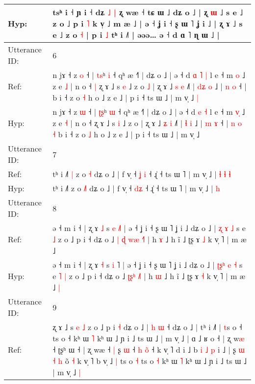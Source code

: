 \documentclass[10pt]{article}
\DeclareRobustCommand{\hl}[1]{{\textcolor{red}{#1}}}
\begin{document}
\begin{longtable}{ll}
 \\
Hyp: & tsʰ i ˧ ɲ i ˧ dʑ \hl{˩} \hl{|} ʐ wæ ˧ tɕ ɯ ˩ dʑ o ˩ | ʐ \hl{ɯ} ˩ s e ˩ z o ˩ p i \hl{˥} k v̩ ˩\hl{}\hl{} m æ ˩ | ə ˧ ʝ i ˧ ʂ ɯ ˥ ʝ i ˩ | ʐ ɤ ˩ s e ˩ z o \hl{}\hl{˧} | p i\hl{}\hl{} \hl{˩} tʰ i ˩˥ | əəə… ə ˧ d ɑ ˥ ɳ ɯ ˩ |
 \\
\midrule
Utterance ID: & 6 \\
Ref: & n jɤ ˧ z \hl{o} ˧ | \hl{t}\hl{s}ʰ \hl{i} ˧ qʰ æ ˧˥ | dʑ o ˩ | ə ˧ d\hl{ }\hl{ɑ} \hl{˥} \hl{|} l e ˧ m \hl{}\hl{o} ˩ z e \hl{˩} | n o ˧\hl{ }\hl{|} ʐ ɤ ˩ s \hl{e} ˩ z o\hl{ }\hl{˩} | ʐ ɤ ˩ \hl{s} \hl{e} ˩˥ | \hl{d}\hl{ʑ} \hl{o} ˩ | \hl{n} \hl{o} ˧ |\hl{}\hl{}\hl{}\hl{}\hl{}\hl{} b i ˧ z o \hl{˧} h o ˩ z e ˩ | p i ˧ ts ɯ ˩ | m v̩ ˩\hl{ }\hl{|}
 \\
Hyp: & n jɤ ˧ z \hl{ɯ} ˧ | \hl{ʈ}\hl{ʂ}ʰ \hl{ɯ} ˧ qʰ æ ˧˥ | dʑ o ˩ | ə ˧ d\hl{}\hl{} \hl{e} \hl{˧} l e ˧ m \hl{v}\hl{̩} ˩ z e \hl{˧} | n o ˧\hl{}\hl{} ʐ ɤ ˩ s \hl{i} ˩ z o\hl{}\hl{} | ʐ ɤ ˩ \hl{ʑ} \hl{i} ˩˥ | \hl{}\hl{ɬ} \hl{i} ˩ | \hl{m} \hl{ɤ} ˧ |\hl{ }\hl{n}\hl{ }\hl{o}\hl{ }\hl{˧} b i ˧ z o \hl{˩} h o ˩ z e ˩ | p i ˧ ts ɯ ˩ | m v̩ ˩\hl{}\hl{}
 \\
\midrule
Utterance ID: & 7 \\
Ref: & tʰ i ˩˥\hl{ }\hl{|} z o \hl{}\hl{˧} dʑ o ˩ | f v̩ ˧ \hl{ʝ}\hl{ }\hl{i} ˧ ɻ̍ ˧ ts ɯ ˥ | m v̩ ˩ |\hl{ }\hl{ɬ}\hl{ }\hl{ɬ} \hl{ɬ}
 \\
Hyp: & tʰ i ˩˥\hl{}\hl{} z o \hl{˩}\hl{˥} dʑ o ˩ | f v̩ ˧ \hl{}\hl{d}\hl{ʑ} ˧ ɻ̍ ˧ ts ɯ ˥ | m v̩ ˩ |\hl{}\hl{}\hl{}\hl{} \hl{h}
 \\
\midrule
Utterance ID: & 8 \\
Ref: & ə ˧ m i ˧ | ʐ ɤ \hl{˩} s \hl{e} \hl{˩}˥ | ə ˧ ʝ i ˧ ʂ ɯ ˥ ʝ i ˩ dʑ o ˩ | \hl{}\hl{}\hl{ʐ} \hl{ɤ} \hl{˩} s e\hl{}\hl{} \hl{˩} z o ˩ p i ˧ dʑ o ˩\hl{ }\hl{|} \hl{ɖ}\hl{ }\hl{w}\hl{æ} \hl{˧}˥ | h \hl{ɤ} ˩ h ĩ ˩ ʈʂ ɤ \hl{˩} k v̩ ˥ | m æ ˩\hl{}\hl{}
 \\
Hyp: & ə ˧ m i ˧ | ʐ ɤ \hl{˧} s \hl{i} \hl{}˥ | ə ˧ ʝ i ˧ ʂ ɯ ˥ ʝ i ˩ dʑ o ˩ | \hl{ʈ}\hl{ʂ}\hl{ʰ} \hl{e} \hl{˧} s e\hl{ }\hl{˥} \hl{|} z o ˩ p i ˧ dʑ o ˩\hl{}\hl{} \hl{}\hl{ʈ}\hl{ʂ}\hl{ʰ} \hl{˩}˥ | h \hl{ɯ} ˩ h ĩ ˩ ʈʂ ɤ \hl{˧} k v̩ ˥ | m æ ˩\hl{ }\hl{|}
 \\
\midrule
Utterance ID: & 9 \\
Ref: & ʐ ɤ ˩ s\hl{}\hl{} \hl{e} \hl{˩} z o ˩ p i \hl{˧} dʑ o ˩ | \hl{h} \hl{}\hl{ɯ} ˧ dʑ o ˩ | tʰ i ˩˥ | \hl{t}s o ˧ ts o ˧ kʰ ɯ \hl{˥} kʰ ɯ ˩ ɲ i ˩ ts ɯ ˩ | m v̩ ˩ | ɑ ˩ ʁ o\hl{}\hl{}\hl{}\hl{}\hl{} ˧ | ʐ w\hl{æ} ˧ ʈʂʰ ɯ ˧ | ʐ wæ ˧\hl{ }\hl{|} ʂ \hl{ɯ} ˧\hl{ }\hl{h} \hl{o}\hl{̃} ˧ k v̩ ˥ d i ˩ b\hl{ }\hl{i}\hl{ }\hl{˩}\hl{ }\hl{p} i ˩ | ʂ\hl{ }\hl{ɯ}\hl{ }\hl{˧}\hl{ }\hl{h} o\hl{̃}\hl{ }\hl{˧} k v̩ ˥ b v̩ ˩\hl{ }\hl{|} ts o \hl{˧} ts o\hl{ }\hl{˧} kʰ ɯ \hl{˥} kʰ ɯ ˩ ɲ i ˩ ts ɯ ˩ | m v̩ ˩\hl{ }\hl{|}

\end{longtable}
\end{document}
